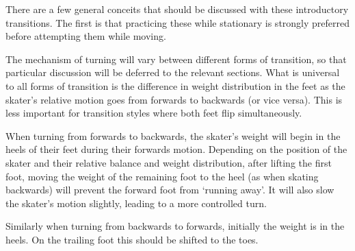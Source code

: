 There are a few general conceits that should be discussed with these introductory transitions. The first is that practicing these while stationary is strongly preferred before attempting them while moving. 



The mechanism of turning will vary between different forms of transition, so that particular discussion will be deferred to the relevant sections.   
What is universal to all forms of transition is the difference in weight distribution in the feet as the skater's relative motion goes from forwards to backwards (or vice versa).   
This is less important for transition styles where both feet flip simultaneously.       


When turning from forwards to backwards, the skater's weight will begin in the heels of their feet during their forwards motion. 
Depending on the position of the skater and their relative balance and weight distribution, after lifting the first foot, moving the weight of the remaining foot to the heel (as when skating backwards) will prevent the forward foot from `running away'. It will also slow the skater's motion slightly, leading to a more controlled turn.     


Similarly when turning from backwards to forwards, initially the weight is in the heels. On the trailing foot this should be shifted to the toes. 



